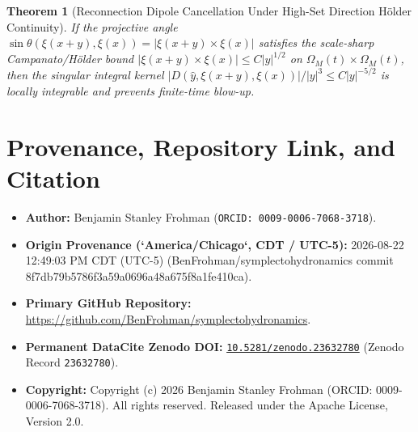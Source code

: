 \documentclass[11pt,letterpaper]{article}
\newtheorem{theorem}{Theorem}
\begin{document}
\begin{theorem}[Reconnection Dipole Cancellation Under High-Set Direction H\"older Continuity]
If the projective angle $\sin\theta(\xi(x+y),\xi(x)) = |\xi(x+y) \times \xi(x)|$ satisfies the scale-sharp Campanato/H\"older bound $|\xi(x+y) \times \xi(x)| \le C |y|^{1/2}$ on $\Omega_M(t) \times \Omega_M(t)$, then the singular integral kernel $|D(\hat{y},\xi(x+y),\xi(x))|/|y|^3 \le C |y|^{-5/2}$ is locally integrable and prevents finite-time blow-up.
\end{theorem}


\section*{Provenance, Repository Link, and Citation}
\begin{itemize}[leftmargin=2em]
  \item \textbf{Author:} Benjamin Stanley Frohman (\texttt{ORCID: 0009-0006-7068-3718}).
  \item \textbf{Origin Provenance (`America/Chicago`, CDT / UTC-5):} 2026-08-22 12:49:03 PM CDT (UTC-5) (BenFrohman/symplectohydronamics commit 8f7db79b5786f3a59a0696a48a675f8a1fe410ca).
  \item \textbf{Primary GitHub Repository:} \url{https://github.com/BenFrohman/symplectohydronamics}.
  \item \textbf{Permanent DataCite Zenodo DOI:} \href{https://doi.org/10.5281/zenodo.23632780}{\texttt{10.5281/zenodo.23632780}} (Zenodo Record \texttt{23632780}).
  \item \textbf{Copyright:} Copyright (c) 2026 Benjamin Stanley Frohman (ORCID: 0009-0006-7068-3718). All rights reserved. Released under the Apache License, Version 2.0.
\end{itemize}
\end{document}
